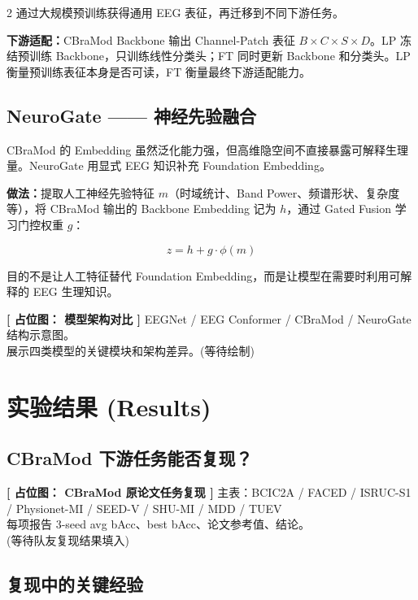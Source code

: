 \documentclass[12pt, a0paper]{article}
\renewcommand{\Large}{\fontsize{34}{42}\selectfont}
\renewcommand{\small}{\fontsize{18}{24}\selectfont}
\newcommand{\placeholder}[2]{%
    \begin{center}
    \colorbox{mygray!12}{\parbox{0.9\columnwidth}{%
        \centering
        \vspace{1.5em}
        {\Large\bfseries\color{mygray} [ 占位图： #1 ]}
        \vspace{0.8em}
        {\small\color{mygray} #2}
        \vspace{1.5em}
    }}
    \end{center}
}
\begin{document}
\begin{multicols}{2}
通过大规模预训练获得通用 EEG 表征，再迁移到不同下游任务。

\textbf{下游适配：}CBraMod Backbone 输出 Channel-Patch 表征 $B \times C \times S \times D$。LP 冻结预训练 Backbone，只训练线性分类头；FT 同时更新 Backbone 和分类头。LP 衡量预训练表征本身是否可读，FT 衡量最终下游适配能力。

\vspace{1em}

\subsection{NeuroGate —— 神经先验融合}

CBraMod 的 Embedding 虽然泛化能力强，但高维隐空间不直接暴露可解释生理量。NeuroGate 用显式 EEG 知识补充 Foundation Embedding。

\textbf{做法：}提取人工神经先验特征 $m$（时域统计、Band Power、频谱形状、复杂度等），将 CBraMod 输出的 Backbone Embedding 记为 $h$，通过 Gated Fusion 学习门控权重 $g$：

\[
z = h + g \cdot \phi(m)
\]

目的不是让人工特征替代 Foundation Embedding，而是让模型在需要时利用可解释的 EEG 生理知识。

\placeholder{模型架构对比}{%
    EEGNet / EEG Conformer / CBraMod / NeuroGate 结构示意图。\\
    展示四类模型的关键模块和架构差异。\quad (等待绘制)}

\section{实验结果 (Results)}

\subsection{CBraMod 下游任务能否复现？}

\placeholder{CBraMod 原论文任务复现}{%
    主表：BCIC2A / FACED / ISRUC-S1 / Physionet-MI / SEED-V / SHU-MI / MDD / TUEV\\
    每项报告 3-seed avg bAcc、best bAcc、论文参考值、结论。\\
    \small (等待队友复现结果填入)}

\subsection{复现中的关键经验}


\end{multicols}
\end{document}
